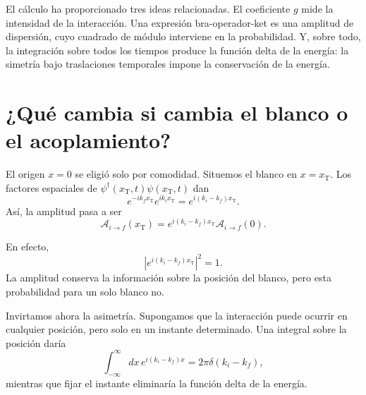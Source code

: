 El cálculo ha proporcionado tres ideas relacionadas. El coeficiente \(g\) mide la intensidad de la interacción. Una expresión bra-operador-ket es una amplitud de dispersión, cuyo cuadrado de módulo interviene en la probabilidad. Y, sobre todo, la integración sobre todos los tiempos produce la función delta de la energía: la simetría bajo traslaciones temporales impone la conservación de la energía.

\section{¿Qué cambia si cambia el blanco o el acoplamiento?}

El origen \(x=0\) se eligió solo por comodidad. Situemos el blanco en \(x=x_{\mathrm T}\). Los factores espaciales de \(\psi^\dagger(x_{\mathrm T},t)\psi(x_{\mathrm T},t)\) dan
\begin{equation}
e^{-ik_f x_{\mathrm T}}e^{ik_i x_{\mathrm T}}
=e^{i(k_i-k_f)x_{\mathrm T}}.
\end{equation}
Así, la amplitud pasa a ser
\begin{equation}
\mathcal A_{i\to f}(x_{\mathrm T})
=e^{i(k_i-k_f)x_{\mathrm T}}
\mathcal A_{i\to f}(0).
\end{equation}

\begin{classroomqa}\end{classroomqa}

En efecto,
\begin{equation}
\left|e^{i(k_i-k_f)x_{\mathrm T}}\right|^2=1.
\end{equation}
La amplitud conserva la información sobre la posición del blanco, pero esta probabilidad para un solo blanco no.

Invirtamos ahora la asimetría. Supongamos que la interacción puede ocurrir en cualquier posición, pero solo en un instante determinado. Una integral sobre la posición daría
\begin{equation}
\int_{-\infty}^{\infty}dx\,
e^{i(k_i-k_f)x}
=2\pi\delta(k_i-k_f),
\end{equation}
mientras que fijar el instante eliminaría la función delta de la energía.

